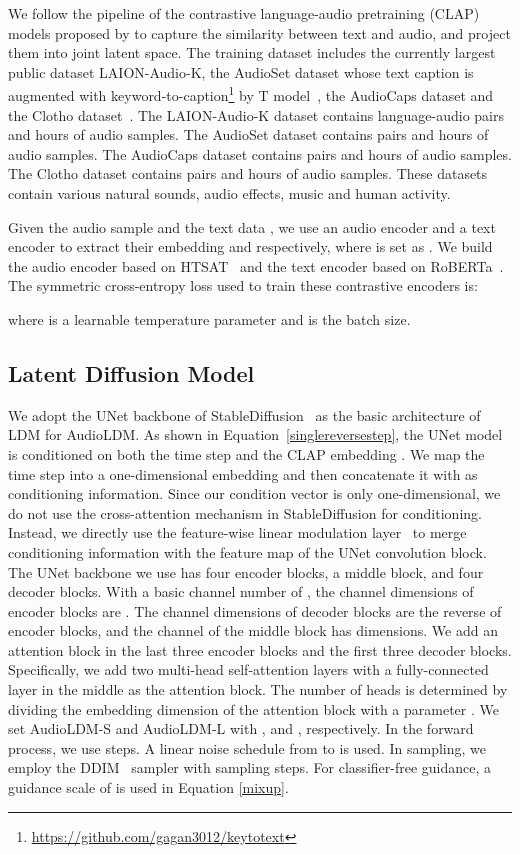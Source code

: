 \documentclass{article}
\begin{document}
We follow the pipeline of the contrastive language-audio pretraining (CLAP) models proposed by \cite{wu2022large} to capture the similarity between text and audio, and project them into joint latent space. The training dataset includes the currently largest public dataset LAION-Audio-K, the AudioSet dataset whose text caption is augmented with keyword-to-caption\footnote{\url{https://github.com/gagan3012/keytotext}} by T model~\cite{T5}, the AudioCaps dataset and the Clotho dataset~\cite{Clotho}. The LAION-Audio-K dataset contains  language-audio pairs and  hours of audio samples. The AudioSet dataset contains  pairs and  hours of audio samples. The AudioCaps dataset contains  pairs and  hours of audio samples. The Clotho dataset contains  pairs and  hours of audio samples. These datasets contain various natural sounds, audio effects, music and human activity.

Given the audio sample  and the text data , we use an audio encoder and a text encoder to extract their embedding  and  respectively, where  is set as . We build the audio encoder based on HTSAT~\cite{HTSAT} and the text encoder based on RoBERTa~\cite{RoBERTa}. The symmetric cross-entropy loss used to train these contrastive encoders is:

where  is a learnable temperature parameter and  is the batch size. 

\subsection{Latent Diffusion Model}
\label{app:LDMArchitecture}

We adopt the UNet backbone of StableDiffusion~\cite{rombach2022high} as the basic architecture of LDM for AudioLDM. As shown in Equation~\ref{singlereversestep}, the UNet model is conditioned on both the time step  and the CLAP embedding . We map the time step into a one-dimensional embedding and then concatenate it with  as conditioning information. Since our condition vector is only one-dimensional, we do not use the cross-attention mechanism in StableDiffusion for conditioning. Instead, we directly use the feature-wise linear modulation layer~\cite{perez2018film} to merge conditioning information with the feature map of the UNet convolution block. The UNet backbone we use has four encoder blocks, a middle block, and four decoder blocks. With a basic channel number of , the channel dimensions of encoder blocks are . The channel dimensions of decoder blocks are the reverse of encoder blocks, and the channel of the middle block has  dimensions. We add an attention block in the last three encoder blocks and the first three decoder blocks. Specifically, we add two multi-head self-attention layers with a fully-connected layer in the middle as the attention block. The number of heads is determined by dividing the embedding dimension of the attention block with a parameter . We set AudioLDM-S and AudioLDM-L with , and , respectively. In the forward process, we use  steps. A linear noise schedule from  to  is used. In sampling, we employ the DDIM~\cite{song2020denoising} sampler with  sampling steps. For classifier-free guidance, a guidance scale  of  is used in Equation \ref{mixup}.
\end{document}

